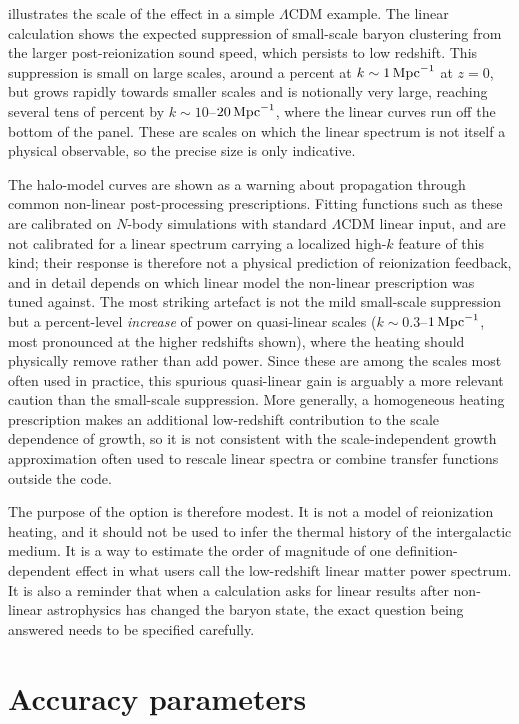\documentclass[prd, twocolumn, superscriptaddress, tightenlines, longbibliography, nofootinbib, eqsecnum, amsfonts, amsmath, floatfix, notitlepage]{revtex4-2}
\begin{document}
 illustrates the scale of the effect in a simple
$\Lambda$CDM example. The linear calculation shows the expected suppression of
small-scale baryon clustering from the larger post-reionization sound speed, which
persists to low redshift. This suppression is small on large scales, around a
percent at $k\sim1\,{\rm Mpc}^{-1}$ at $z=0$, but grows rapidly towards smaller
scales and is notionally very large, reaching several tens of percent by
$k\sim10$--$20\,{\rm Mpc}^{-1}$, where the linear curves run off the bottom of the
panel. These are scales on which the linear spectrum is not itself a physical
observable, so the precise size is only indicative.

The halo-model curves are shown as a warning about propagation through common
non-linear post-processing prescriptions. Fitting functions such as these are
calibrated on $N$-body simulations with standard $\Lambda$CDM linear input, and
are not calibrated for a linear spectrum carrying a localized high-$k$ feature of
this kind; their response is therefore not a physical prediction of reionization
feedback, and in detail depends on which linear model the non-linear prescription
was tuned against. The most striking artefact is not the mild small-scale
suppression but a percent-level \emph{increase} of power on quasi-linear scales
($k\sim0.3$--$1\,{\rm Mpc}^{-1}$, most pronounced at the higher redshifts shown),
where the heating should physically remove rather than add power. Since these are
among the scales most often used in practice, this spurious quasi-linear gain is
arguably a more relevant caution than the small-scale suppression. More
generally, a homogeneous heating prescription makes an additional low-redshift
contribution to the scale dependence of growth, so it is not consistent with the
scale-independent growth approximation often used to rescale linear spectra or
combine transfer functions outside the code.

The purpose of the option is therefore modest. It is not a model of reionization
heating, and it should not be used to infer the thermal history of the
intergalactic medium. It is a way to estimate the order of magnitude of one
definition-dependent effect in what users call the low-redshift linear matter
power spectrum. It is also a reminder that when a calculation asks for linear
results after non-linear astrophysics has changed the baryon state, the exact
question being answered needs to be specified carefully.


\section{Accuracy parameters}
\label{app:accuracy}
\end{document}
